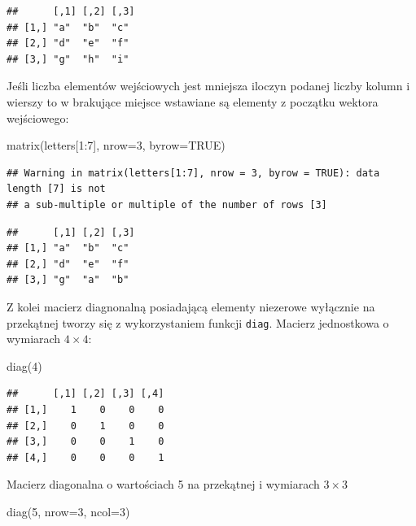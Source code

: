 \documentclass[
]{book}
\newenvironment{Shaded}{\begin{snugshade}}{\end{snugshade}}
\newcommand{\AttributeTok}[1]{\textcolor[rgb]{0.77,0.63,0.00}{#1}}
\newcommand{\ConstantTok}[1]{\textcolor[rgb]{0.00,0.00,0.00}{#1}}
\newcommand{\DecValTok}[1]{\textcolor[rgb]{0.00,0.00,0.81}{#1}}
\newcommand{\FunctionTok}[1]{\textcolor[rgb]{0.00,0.00,0.00}{#1}}
\newcommand{\NormalTok}[1]{#1}
\newcommand{\SpecialCharTok}[1]{\textcolor[rgb]{0.00,0.00,0.00}{#1}}
\begin{document}
\begin{verbatim}
##      [,1] [,2] [,3]
## [1,] "a"  "b"  "c" 
## [2,] "d"  "e"  "f" 
## [3,] "g"  "h"  "i"
\end{verbatim}

Jeśli liczba elementów wejściowych jest mniejsza iloczyn podanej liczby kolumn i wierszy to w brakujące miejsce wstawiane są elementy z początku wektora wejściowego:

\begin{Shaded}
\begin{Highlighting}[]
\FunctionTok{matrix}\NormalTok{(letters[}\DecValTok{1}\SpecialCharTok{:}\DecValTok{7}\NormalTok{], }\AttributeTok{nrow=}\DecValTok{3}\NormalTok{, }\AttributeTok{byrow=}\ConstantTok{TRUE}\NormalTok{)}
\end{Highlighting}
\end{Shaded}

\begin{verbatim}
## Warning in matrix(letters[1:7], nrow = 3, byrow = TRUE): data length [7] is not
## a sub-multiple or multiple of the number of rows [3]
\end{verbatim}

\begin{verbatim}
##      [,1] [,2] [,3]
## [1,] "a"  "b"  "c" 
## [2,] "d"  "e"  "f" 
## [3,] "g"  "a"  "b"
\end{verbatim}

Z kolei macierz diagnonalną posiadającą elementy niezerowe wyłącznie na przekątnej tworzy się z wykorzystaniem funkcji \texttt{diag}. Macierz jednostkowa o wymiarach \(4 \times 4\):

\begin{Shaded}
\begin{Highlighting}[]
\FunctionTok{diag}\NormalTok{(}\DecValTok{4}\NormalTok{)}
\end{Highlighting}
\end{Shaded}

\begin{verbatim}
##      [,1] [,2] [,3] [,4]
## [1,]    1    0    0    0
## [2,]    0    1    0    0
## [3,]    0    0    1    0
## [4,]    0    0    0    1
\end{verbatim}

Macierz diagonalna o wartościach 5 na przekątnej i wymiarach \(3 \times 3\)

\begin{Shaded}
\begin{Highlighting}[]
\FunctionTok{diag}\NormalTok{(}\DecValTok{5}\NormalTok{, }\AttributeTok{nrow=}\DecValTok{3}\NormalTok{, }\AttributeTok{ncol=}\DecValTok{3}\NormalTok{)}
\end{Highlighting}
\end{Shaded}
\end{document}

